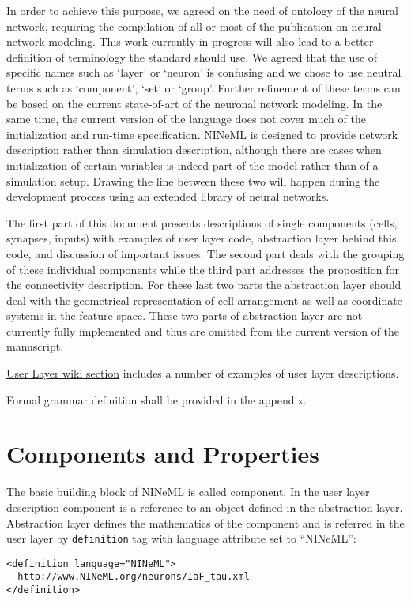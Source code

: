 \documentclass{article}
\begin{document}
In order to achieve this purpose, we agreed on the need of ontology of the neural
network, requiring the compilation of all or most of the publication on neural
network modeling. This work currently in progress will also lead to a better
definition of terminology the standard should use. We agreed that the use of
specific names such as `layer' or `neuron' is confusing and we chose to use neutral
terms such as `component', `set' or `group'. Further refinement of these terms can
be based on the current state-of-art of the neuronal network modeling. In the same
time, the current version of the language does
not cover much of the initialization and run-time specification. NINeML is
designed to provide network description rather than simulation description,
although there are cases when initialization of certain variables is indeed
part of the model rather than of a simulation setup. Drawing the line between
these two will happen during the development process using an extended library
of neural networks.

The first part of this document presents descriptions of single components
(cells, synapses, inputs) with examples of user layer code, abstraction layer
behind this code, and discussion of important issues. The second part deals with the
grouping of these individual components while the third part addresses the
proposition for the connectivity description. For these last two parts the abstraction
layer should deal with the geometrical representation of cell arrangement as well
as coordinate systems in the feature space. These two parts of abstraction layer
are not currently fully implemented and thus are omitted from the current version
of the manuscript.

\href{http://www.incf.org/core/programs/modeling/wiki/documentation/user-layer}
{\underline{User Layer wiki section}} includes a number of examples of user layer
descriptions.

Formal grammar definition shall be provided in the appendix.

\section{Components and Properties}

The basic building block of NINeML is called component. In the user layer description
component is a reference to an object defined in the abstraction layer.
Abstraction layer defines the mathematics of the component and is referred
in the user layer by {\tt definition} tag with language attribute set to ``NINeML'':
\begin{verbatim}
<definition language="NINeML">
  http://www.NINeML.org/neurons/IaF_tau.xml
</definition>
\end{verbatim}
\end{document}

